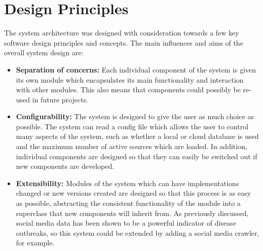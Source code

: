 \documentclass{l4proj}
\begin{document}
\section{Design Principles}
The system architecture was designed with consideration towards a few key software design principles and concepts. The main influences and aims of the overall system design are:
\begin{itemize}
    \item \textbf{Separation of concerns: } Each individual component of the system is given its own module which encapsulates its main functionality and interaction with other modules. This also means that components could possibly be re-used in future projects.
    \item \textbf{Configurability: } The system is designed to give the user as much choice as possible. The system can read a config file which allows the user to control many aspects of the system, such as whether a local or cloud database is used and the maximum number of active sources which are loaded. In addition, individual components are designed so that they can easily be switched out if new components are developed.
    \item \textbf{Extensibility: } Modules of the system which can have implementations changed or new versions created are designed so that this process is as easy as possible, abstracting the consistent functionality of the module into a superclass that new components will inherit from. As previously discussed, social media data has been shown to be a powerful indicator of disease outbreaks, so this system could be extended by adding a social media crawler, for example.
\end{itemize}
\end{document}
